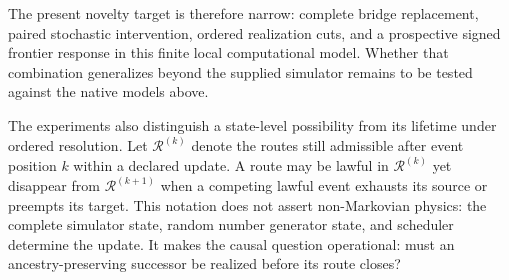 The present novelty target is therefore narrow: complete bridge replacement,
paired stochastic intervention, ordered realization cuts, and a prospective
signed frontier response in this finite local computational model. Whether that
combination generalizes beyond the supplied simulator remains to be tested
against the native models above.

The experiments also distinguish a state-level possibility from its lifetime
under ordered resolution. Let $\mathcal{R}^{(k)}$ denote the routes still
admissible after event position $k$ within a declared update. A route may be
lawful in $\mathcal{R}^{(k)}$ yet disappear from $\mathcal{R}^{(k+1)}$ when a
competing lawful event exhausts its source or preempts its target. This notation
does not assert non-Markovian physics: the complete simulator state, random
number generator state, and scheduler determine the update. It makes the causal
question operational: must an ancestry-preserving successor be realized before
its route closes?

